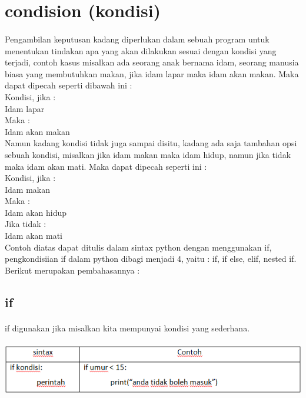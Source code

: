 \documentclass[a4paper,12pt]{report}
\begin{document}
\section{condision (kondisi)}
\paragraph{}
Pengambilan keputusan kadang diperlukan dalam sebuah program untuk menentukan tindakan apa yang akan dilakukan sesuai dengan kondisi yang terjadi, contoh kasus misalkan ada seorang anak bernama idam, seorang manusia biasa yang membutuhkan makan, jika idam lapar maka idam akan makan. Maka dapat dipecah seperti dibawah ini :\\

Kondisi, jika :\\
Idam lapar\\
Maka :\\
Idam akan makan\\

Namun kadang kondisi tidak juga sampai disitu, kadang ada saja tambahan opsi sebuah kondisi, misalkan jika idam makan maka idam hidup, namun jika tidak maka idam akan mati. Maka dapat dipecah seperti ini :\\

Kondisi, jika :\\
Idam makan\\
Maka :\\
Idam akan hidup\\
Jika tidak :\\
Idam akan mati\\
	
Contoh diatas dapat ditulis dalam sintax python dengan menggunakan if, pengkondisiian if dalam python dibagi menjadi 4, yaitu : if, if else, elif, nested if. Berikut merupakan pembahasannya :
\subsection{if}
\paragraph{}
if digunakan jika misalkan kita mempunyai kondisi yang sederhana.\\ \\
\includegraphics[scale=1]{images/if.png} 
\end{document}
